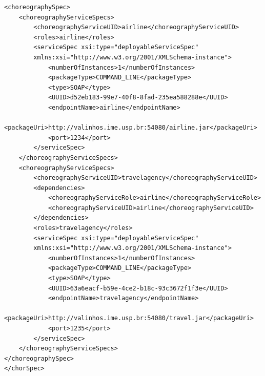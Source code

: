 \documentclass[a4paper, 10pt]{article}
\begin{document}
{\footnotesize

\lstset{language=XML}

\begin{lstlisting}[caption=ChorSpec XML representation example, label=lst:chor_spec_xml]
<choreographySpec>
    <choreographyServiceSpecs>
        <choreographyServiceUID>airline</choreographyServiceUID>
        <roles>airline</roles>
        <serviceSpec xsi:type="deployableServiceSpec" 
        xmlns:xsi="http://www.w3.org/2001/XMLSchema-instance">
            <numberOfInstances>1</numberOfInstances>
            <packageType>COMMAND_LINE</packageType>
            <type>SOAP</type>
            <UUID>d52eb183-99e7-40f8-8fad-235ea588288e</UUID>
            <endpointName>airline</endpointName>
            <packageUri>http://valinhos.ime.usp.br:54080/airline.jar</packageUri>
            <port>1234</port>
        </serviceSpec>
    </choreographyServiceSpecs>
    <choreographyServiceSpecs>
        <choreographyServiceUID>travelagency</choreographyServiceUID>
        <dependencies>
            <choreographyServiceRole>airline</choreographyServiceRole>
            <choreographyServiceUID>airline</choreographyServiceUID>
        </dependencies>
        <roles>travelagency</roles>
        <serviceSpec xsi:type="deployableServiceSpec" 
        xmlns:xsi="http://www.w3.org/2001/XMLSchema-instance">
            <numberOfInstances>1</numberOfInstances>
            <packageType>COMMAND_LINE</packageType>
            <type>SOAP</type>
            <UUID>63a6eacf-b59e-4ce2-b18c-93c3672f1f3e</UUID>
            <endpointName>travelagency</endpointName>
            <packageUri>http://valinhos.ime.usp.br:54080/travel.jar</packageUri>
            <port>1235</port>
        </serviceSpec>
    </choreographyServiceSpecs>
</choreographySpec>
</chorSpec>\end{lstlisting}

}
\end{document}
